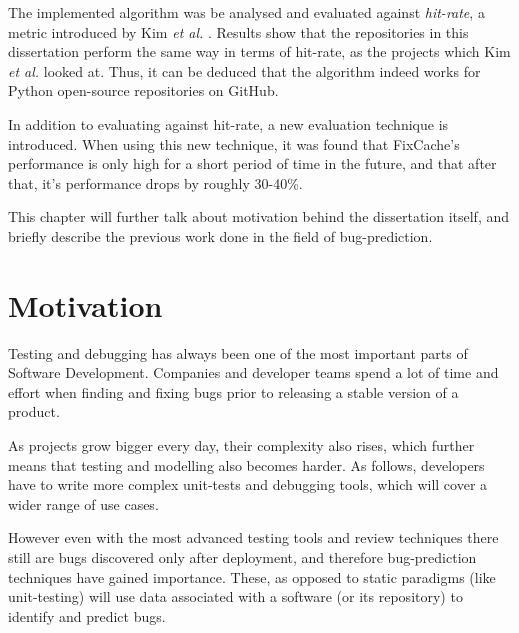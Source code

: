 \documentclass[12pt,twoside,notitlepage]{report}
\newcommand{\fxch}{FixCache}
\newcommand{\etal}{\textit{et al.}}
\begin{document}
The implemented algorithm was be analysed and evaluated against \textit{hit-rate}, a metric introduced by Kim \etal{} \cite{FixCache}. Results show that the repositories in this dissertation perform the same way in terms of hit-rate, as the projects which Kim \etal{} looked at. Thus, it can be deduced that the algorithm indeed works for Python open-source repositories on GitHub.

In addition to evaluating against hit-rate, a new evaluation technique is introduced. When using this new technique, it was found that \fxch{}'s performance is only high for a short period of time in the future, and that after that, it's performance drops by roughly 30-40\%.

This chapter will further talk about motivation behind the dissertation itself, and briefly describe the previous work done in the field of bug-prediction.
\clearpage
\section{Motivation}
Testing and debugging has always been one of the most important parts of Software Development. Companies and developer teams spend a lot of time and effort when finding and fixing bugs prior to releasing a stable version of a product.

As  projects grow bigger every day, their complexity also rises, which further means that testing and modelling also becomes harder. As follows, developers have to write more complex unit-tests and debugging tools, which will cover a wider range of use cases.

However even with the most advanced testing tools and review techniques there still are bugs discovered only after deployment, and therefore bug-prediction techniques have gained importance. These, as opposed to static paradigms (like unit-testing) will use data associated with a software (or its repository) to identify and predict bugs.
\end{document}
